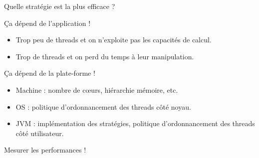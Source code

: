 
\begingroup

\begin{frame}{Quelle stratégie est la plus efficace ?}
  \begin{block}{Ça dépend de l'application !} 
    \begin{itemize}
    \item Trop peu de threads et on n'exploite pas les capacités de calcul. 
    \item Trop de threads et on perd du temps à leur manipulation.
    \end{itemize}
  \end{block}
  
  \begin{block}{Ça dépend de la plate-forme !}
    \begin{itemize}
    \item Machine : nombre de c{\oe}urs, hiérarchie mémoire, etc.
    \item OS : politique d'ordonnancement des threads côté noyau.
    \item JVM : implémentation des stratégies, politique d'ordonnancement des threads côté utilisateur.
    \end{itemize}
  \end{block}
  
  \begin{center}
  \alert{Mesurer les performances !}
  \end{center}
\end{frame}

\endgroup
\endinput

